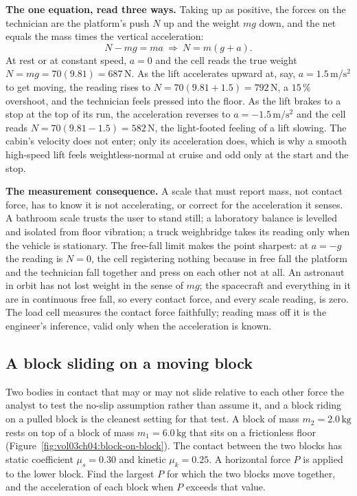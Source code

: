 \textbf{The one equation, read three ways.} Taking up as positive, the
forces on the technician are the platform's push $N$ up and the weight
$mg$ down, and the net equals the mass times the vertical acceleration:
\[
N-mg=ma \ \Rightarrow\ N=m(g+a).
\]
At rest or at constant speed, $a=0$ and the cell reads the true weight
$N=mg=70(9.81)=687\,\si{\newton}$. As the lift accelerates upward at, say,
$a=1.5\,\si{\meter\per\second\squared}$ to get moving, the reading rises
to $N=70(9.81+1.5)=792\,\si{\newton}$, a $15\,\%$ overshoot, and the
technician feels pressed into the floor. As the lift brakes to a stop at
the top of its run, the acceleration reverses to $a=-1.5\,\si{\meter\per
\second\squared}$ and the cell reads $N=70(9.81-1.5)=582\,\si{\newton}$,
the light-footed feeling of a lift slowing. The cabin's velocity does not
enter; only its acceleration does, which is why a smooth high-speed lift
feels weightless-normal at cruise and odd only at the start and the
stop.

\textbf{The measurement consequence.} A scale that must report mass, not
contact force, has to know it is not accelerating, or correct for the
acceleration it senses. A bathroom scale trusts the user to stand still;
a laboratory balance is levelled and isolated from floor vibration; a
truck weighbridge takes its reading only when the vehicle is stationary.
The free-fall limit makes the point sharpest: at $a=-g$ the reading is
$N=0$, the cell registering nothing because in free fall the platform and
the technician fall together and press on each other not at all. An
astronaut in orbit has not lost weight in the sense of $mg$; the
spacecraft and everything in it are in continuous free fall, so every
contact force, and every scale reading, is zero. The load cell measures
the contact force faithfully; reading mass off it is the engineer's
inference, valid only when the acceleration is known.







\subsection{A block sliding on a moving block}

Two bodies in contact that may or may not slide relative to each other
force the analyst to test the no-slip assumption rather than assume it,
and a block riding on a pulled block is the cleanest setting for that
test. A block of mass $m_{2}=2.0\,\si{\kilogram}$ rests on top of a
block of mass $m_{1}=6.0\,\si{\kilogram}$ that sits on a frictionless
floor (Figure~\ref{fig:vol03ch04:block-on-block}). The contact between
the two blocks has static coefficient $\mu_{s}=0.30$ and kinetic
$\mu_{k}=0.25$. A horizontal force $P$ is applied to the lower block.
Find the largest $P$ for which the two blocks move together, and the
acceleration of each block when $P$ exceeds that value.

